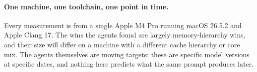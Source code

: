 \paragraph{One machine, one toolchain, one point in time.}
Every measurement is from a single Apple M4 Pro running macOS 26.5.2 and Apple
Clang 17. The wins the agents found are largely memory-hierarchy wins, and their
size will differ on a machine with a different cache hierarchy or core mix. The
agents themselves are moving targets: these are specific model versions at
specific dates, and nothing here predicts what the same prompt produces later.
